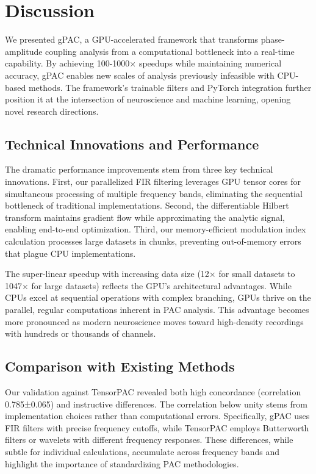 
\section{Discussion}
\label{sec:discussion}

We presented gPAC, a GPU-accelerated framework that transforms phase-amplitude coupling analysis from a computational bottleneck into a real-time capability. By achieving 100-1000× speedups while maintaining numerical accuracy, gPAC enables new scales of analysis previously infeasible with CPU-based methods. The framework's trainable filters and PyTorch integration further position it at the intersection of neuroscience and machine learning, opening novel research directions.

\subsection{Technical Innovations and Performance}

The dramatic performance improvements stem from three key technical innovations. First, our parallelized FIR filtering leverages GPU tensor cores for simultaneous processing of multiple frequency bands, eliminating the sequential bottleneck of traditional implementations. Second, the differentiable Hilbert transform maintains gradient flow while approximating the analytic signal, enabling end-to-end optimization. Third, our memory-efficient modulation index calculation processes large datasets in chunks, preventing out-of-memory errors that plague CPU implementations.

The super-linear speedup with increasing data size (12× for small datasets to 1047× for large datasets) reflects the GPU's architectural advantages. While CPUs excel at sequential operations with complex branching, GPUs thrive on the parallel, regular computations inherent in PAC analysis. This advantage becomes more pronounced as modern neuroscience moves toward high-density recordings with hundreds or thousands of channels.

\subsection{Comparison with Existing Methods}

Our validation against TensorPAC revealed both high concordance (correlation 0.785±0.065) and instructive differences. The correlation below unity stems from implementation choices rather than computational errors. Specifically, gPAC uses FIR filters with precise frequency cutoffs, while TensorPAC employs Butterworth filters or wavelets with different frequency responses. These differences, while subtle for individual calculations, accumulate across frequency bands and highlight the importance of standardizing PAC methodologies.

